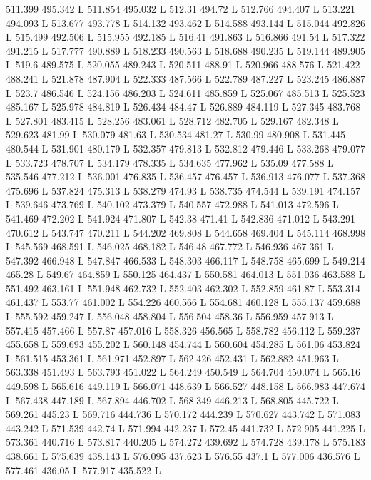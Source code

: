 511.399 495.342 L
511.854 495.032 L
512.31 494.72 L
512.766 494.407 L
513.221 494.093 L
513.677 493.778 L
514.132 493.462 L
514.588 493.144 L
515.044 492.826 L
515.499 492.506 L
515.955 492.185 L
516.41 491.863 L
516.866 491.54 L
517.322 491.215 L
517.777 490.889 L
518.233 490.563 L
518.688 490.235 L
519.144 489.905 L
519.6 489.575 L
520.055 489.243 L
520.511 488.91 L
520.966 488.576 L
521.422 488.241 L
521.878 487.904 L
522.333 487.566 L
522.789 487.227 L
523.245 486.887 L
523.7 486.546 L
524.156 486.203 L
524.611 485.859 L
525.067 485.513 L
525.523 485.167 L
525.978 484.819 L
526.434 484.47 L
526.889 484.119 L
527.345 483.768 L
527.801 483.415 L
528.256 483.061 L
528.712 482.705 L
529.167 482.348 L
529.623 481.99 L
530.079 481.63 L
530.534 481.27 L
530.99 480.908 L
531.445 480.544 L
531.901 480.179 L
532.357 479.813 L
532.812 479.446 L
533.268 479.077 L
533.723 478.707 L
534.179 478.335 L
534.635 477.962 L
535.09 477.588 L
535.546 477.212 L
536.001 476.835 L
536.457 476.457 L
536.913 476.077 L
537.368 475.696 L
537.824 475.313 L
538.279 474.93 L
538.735 474.544 L
539.191 474.157 L
539.646 473.769 L
540.102 473.379 L
540.557 472.988 L
541.013 472.596 L
541.469 472.202 L
541.924 471.807 L
542.38 471.41 L
542.836 471.012 L
543.291 470.612 L
543.747 470.211 L
544.202 469.808 L
544.658 469.404 L
545.114 468.998 L
545.569 468.591 L
546.025 468.182 L
546.48 467.772 L
546.936 467.361 L
547.392 466.948 L
547.847 466.533 L
548.303 466.117 L
548.758 465.699 L
549.214 465.28 L
549.67 464.859 L
550.125 464.437 L
550.581 464.013 L
551.036 463.588 L
551.492 463.161 L
551.948 462.732 L
552.403 462.302 L
552.859 461.87 L
553.314 461.437 L
553.77 461.002 L
554.226 460.566 L
554.681 460.128 L
555.137 459.688 L
555.592 459.247 L
556.048 458.804 L
556.504 458.36 L
556.959 457.913 L
557.415 457.466 L
557.87 457.016 L
558.326 456.565 L
558.782 456.112 L
559.237 455.658 L
559.693 455.202 L
560.148 454.744 L
560.604 454.285 L
561.06 453.824 L
561.515 453.361 L
561.971 452.897 L
562.426 452.431 L
562.882 451.963 L
563.338 451.493 L
563.793 451.022 L
564.249 450.549 L
564.704 450.074 L
565.16 449.598 L
565.616 449.119 L
566.071 448.639 L
566.527 448.158 L
566.983 447.674 L
567.438 447.189 L
567.894 446.702 L
568.349 446.213 L
568.805 445.722 L
569.261 445.23 L
569.716 444.736 L
570.172 444.239 L
570.627 443.742 L
571.083 443.242 L
571.539 442.74 L
571.994 442.237 L
572.45 441.732 L
572.905 441.225 L
573.361 440.716 L
573.817 440.205 L
574.272 439.692 L
574.728 439.178 L
575.183 438.661 L
575.639 438.143 L
576.095 437.623 L
576.55 437.1 L
577.006 436.576 L
577.461 436.05 L
577.917 435.522 L
